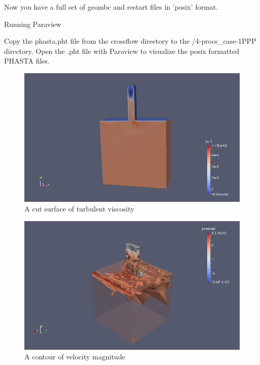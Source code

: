 \documentclass{article}
\begin{document}
Now you have a full set of geombc and restart files in 'posix' format.

Running Paraview

Copy the phasta.pht file from the crossflow directory to the /4-procs\_case-1PPP directory. Open the .pht file with Paraview to visualize the posix formatted PHASTA files.


\begin{figure}[h!]
  \centering
    \includegraphics[width=1\textwidth]{res1}
  \caption{A cut surface of turbulent viscosity}
\end{figure}

\begin{figure}[h!]
  \centering
    \includegraphics[width=1\textwidth]{res2}
  \caption{A contour of velocity magnitude}
\end{figure}

\pagebreak
\end{document}
